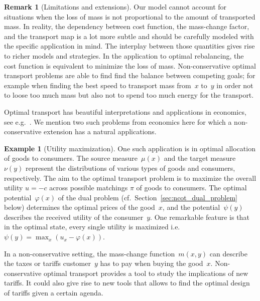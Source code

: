 \documentclass{article}
\theoremstyle{definition}
\newtheorem{example}[theorem]{Example}
\newtheorem{remark}[theorem]{Remark}
\begin{document}
\begin{remark}[Limitations and extensions]
    Our model cannot account for situations when the loss of mass is not proportional to the amount of transported mass. In reality, the dependency between cost function, the mass-change factor, and the transport map is a lot more subtle and should be carefully modeled with the specific application in mind. The interplay between those quantities gives rise to richer models and strategies.  In the application to optimal rebalancing, the cost function is equivalent to minimize the loss of mass. Non-conservative optimal transport problems are able to find find the balance between competing goals; for example when finding the best speed to transport mass from~$x$ to~$y$ in order not to loose too much mass but also not to spend too much energy for the transport.
\end{remark}

Optimal transport has beautiful interpretations and applications in economics, see e.g.~\cite[Section~1.7.3]{santambrogio2015otam}. We mention two such problems from economics here for which a non-conservative extension has a natural applications. 

\begin{example}[Utility maximization]
     One such application is in optimal allocation of goods to consumers. The source measure~$\mu(x)$ and the target measure~$\nu(y)$ represent the distributions of various types of goods and consumers, respectively. The aim to the optimal transport problem is to maximize the overall utility $u = -c$ across possible matchings $\pi$ of goods to consumers. The optimal potential~$\varphi (x)$ of the dual problem (cf.~Section~\ref{sec:ncot_dual_problem} below) determines the optimal prices of the good~$x$, and the potential~$\psi(y)$ describes the received utility of the consumer~$y$. One remarkable feature is that in the optimal state, every single utility is maximized i.e.~$\psi(y) = \max_{x} (u_x - \varphi(x))$. 
    
    In a non-conservative setting, the mass-change function~$m(x,y)$ can describe the taxes or tariffs customer~$y$ has to pay when buying the good~$x$. Non-conservative optimal transport provides a tool to study the implications of new tariffs. It could also give rise to new tools that allows to find the optimal design of tariffs given a certain agenda.
\end{example}
\end{document}
